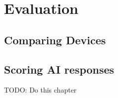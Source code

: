 \chapter{Evaluation}
\label{cha:evaluation}
\section{Comparing Devices}
\section{Scoring AI responses}



TODO: Do this chapter
